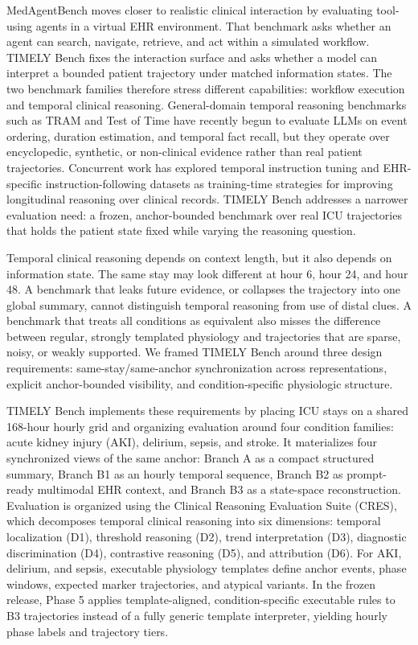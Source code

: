 \documentclass[pdflatex,sn-nature]{sn-jnl}
\begin{document}
MedAgentBench moves closer to realistic clinical interaction by evaluating tool-using agents in a virtual EHR environment\cite{jiang2025medagentbench}. That benchmark asks whether an agent can search, navigate, retrieve, and act within a simulated workflow. TIMELY Bench fixes the interaction surface and asks whether a model can interpret a bounded patient trajectory under matched information states. The two benchmark families therefore stress different capabilities: workflow execution and temporal clinical reasoning. General-domain temporal reasoning benchmarks such as TRAM and Test of Time have recently begun to evaluate LLMs on event ordering, duration estimation, and temporal fact recall, but they operate over encyclopedic, synthetic, or non-clinical evidence rather than real patient trajectories\cite{wang2024tram,fatemi2025testoftime}. Concurrent work has explored temporal instruction tuning and EHR-specific instruction-following datasets as training-time strategies for improving longitudinal reasoning over clinical records\cite{cui2025timer,wu2024ehrinstruction}. TIMELY Bench addresses a narrower evaluation need: a frozen, anchor-bounded benchmark over real ICU trajectories that holds the patient state fixed while varying the reasoning question.

Temporal clinical reasoning depends on context length, but it also depends on information state. The same stay may look different at hour 6, hour 24, and hour 48. A benchmark that leaks future evidence, or collapses the trajectory into one global summary, cannot distinguish temporal reasoning from use of distal clues. A benchmark that treats all conditions as equivalent also misses the difference between regular, strongly templated physiology and trajectories that are sparse, noisy, or weakly supported. We framed TIMELY Bench around three design requirements: same-stay/same-anchor synchronization across representations, explicit anchor-bounded visibility, and condition-specific physiologic structure.

TIMELY Bench implements these requirements by placing ICU stays on a shared 168-hour hourly grid and organizing evaluation around four condition families: acute kidney injury (AKI), delirium, sepsis, and stroke. It materializes four synchronized views of the same anchor: Branch A as a compact structured summary, Branch B1 as an hourly temporal sequence, Branch B2 as prompt-ready multimodal EHR context, and Branch B3 as a state-space reconstruction. Evaluation is organized using the Clinical Reasoning Evaluation Suite (CRES), which decomposes temporal clinical reasoning into six dimensions: temporal localization (D1), threshold reasoning (D2), trend interpretation (D3), diagnostic discrimination (D4), contrastive reasoning (D5), and attribution (D6). For AKI, delirium, and sepsis, executable physiology templates define anchor events, phase windows, expected marker trajectories, and atypical variants. In the frozen release, Phase 5 applies template-aligned, condition-specific executable rules to B3 trajectories instead of a fully generic template interpreter, yielding hourly phase labels and trajectory tiers.
\end{document}
